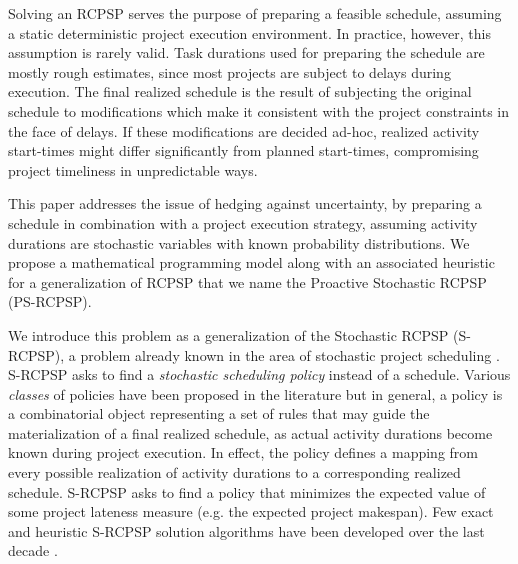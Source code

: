 	
	Solving an RCPSP serves the purpose of preparing a feasible schedule,
	assuming a static deterministic project execution environment.
 	In practice, however, this assumption is rarely valid.
 	Task durations used for preparing the schedule are mostly rough estimates,
 	since most projects are subject to delays during execution.
 	The final realized schedule is the result of 
 	subjecting the original schedule to modifications
 	which make it consistent with the project constraints in the face of delays.
 	If these modifications are decided ad-hoc,
 	realized activity start-times might differ significantly from planned start-times,
  	compromising project timeliness in unpredictable ways.
	
	This paper addresses the issue of hedging against uncertainty,
	by preparing a schedule in combination with a project execution strategy,
	assuming activity durations are stochastic variables with known probability distributions.
 	We propose a mathematical programming model along with an associated heuristic
	for a generalization of RCPSP that we name the Proactive Stochastic RCPSP (PS-RCPSP).
 	
 	We introduce this problem as a generalization of the Stochastic RCPSP (S-RCPSP),
	a problem already known in the area of stochastic project scheduling \cite{herroelen2004robust}.
	S-RCPSP asks to find a \emph{stochastic scheduling policy} instead of a schedule.
	Various \emph{classes} of policies have been proposed in the literature 
	\cite{mohring1984stochastic,mohring1985stochastic,herroelen2004robust} but in general,
	a policy is a combinatorial object representing a set of rules
	that may guide the materialization of a final realized schedule,
	as actual activity durations become known during project execution.
	In effect, the policy defines a mapping from
	every possible realization of activity durations to a corresponding realized schedule.
	S-RCPSP asks to find a policy that minimizes the expected value of some project lateness measure
	(e.g. the expected project makespan).
	Few exact and heuristic S-RCPSP solution algorithms have been developed over the last decade
	\cite{stork2000branch,ballestin2007worthwhile,ballestin2009resource,ashtiani2011new}.
	
	
